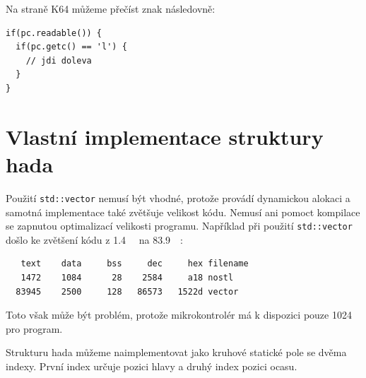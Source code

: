 \documentclass[12pt]{article}
\begin{document}
Na straně K64 můžeme přečíst znak následovně:
\begin{verbatim}
if(pc.readable()) {
  if(pc.getc() == 'l') {
    // jdi doleva
  }
}
\end{verbatim}

\section{Vlastní implementace struktury hada}
Použití \texttt{std::vector} nemusí být vhodné, protože provádí dynamickou alokaci a samotná implementace také zvětšuje velikost kódu.
Nemusí ani pomoct kompilace se zapnutou optimalizací velikosti programu.
Například při použití \texttt{std::vector} došlo ke zvětšení kódu z \SI{1.4}{\kilo\byte} na \SI{83.9}{\kilo \byte}:
\begin{verbatim}
   text    data     bss     dec     hex filename
   1472    1084      28    2584     a18 nostl
  83945    2500     128   86573   1522d vector
\end{verbatim}
Toto však může být problém, protože mikrokontrolér má k dispozici pouze \SI{1024}{\kilo\byte} pro program.

Strukturu hada můžeme naimplementovat jako kruhové statické pole se dvěma indexy.
První index určuje pozici hlavy a druhý index pozici ocasu.
\end{document}
